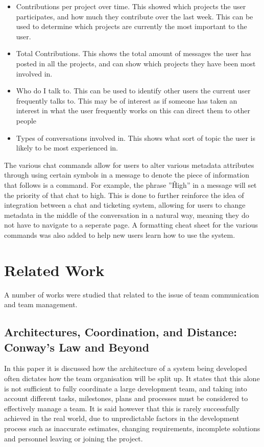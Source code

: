 \documentclass{l4proj}
\begin{document}
\begin{itemize}
\item Contributions per project over time.  This showed which projects the user participates, and how much they contribute over the last week.  This can be used to determine which projects are currently the most important to the user.
\item Total Contributions.  This shows the total amount of messages the user has posted in all the projects, and can show which projects they have been most involved in.
\item Who do I talk to.  This can be used to identify other users the current user frequently talks to.  This may be of interest as if someone has taken an interest in what the user frequently works on this can direct them to other people
\item Types of conversations involved in.  This shows what sort of topic the user is likely to be most experienced in. 
\end{itemize}

The various chat commands allow for users to alter various metadata attributes through using certain symbols in a message to denote the piece of information that follows is a command.  For example, the phrase ''\^High'' in a message will set the priority of that chat to high.  This is done to further reinforce the idea of integration between a chat and ticketing system, allowing for users to change metadata in the middle of the conversation in a natural way, meaning they do not have to navigate to a seperate page.  A formatting cheat sheet for the various commands was also added to help new users learn how to use the system.





\chapter{Related Work}
A number of works were studied that related to the issue of team communication and team management.

\section{Architectures, Coordination, and Distance: Conway's Law and Beyond}

In this paper it is discussed how the architecture of a system being developed often dictates how the team organisation will be split up.  It states that this alone is not sufficient to fully coordinate a large development team, and taking into account different tasks, milestones, plans and processes must be considered to effectively manage a team.  It is said however that this is rarely successfully achieved in the real world, due to unpredictable factors in the development process such as inaccurate estimates, changing requirements, incomplete solutions and personnel leaving or joining the project.  
\end{document}
